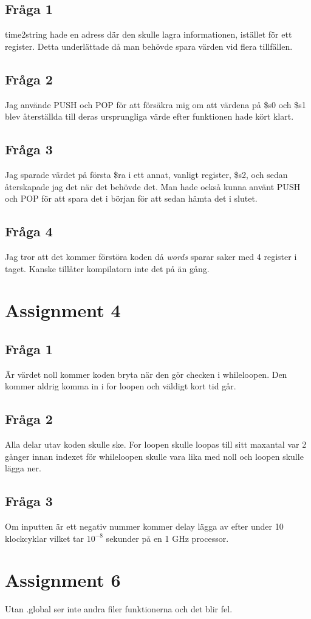 \documentclass[a4paper,11p]{article}
\begin{document}
\subsection{Fråga 1}
time2string hade en adress där den skulle lagra informationen, istället för ett register. Detta underlättade då man behövde spara värden vid flera tillfällen. 
\subsection{Fråga 2}
Jag använde PUSH och POP för att försäkra mig om att värdena på \$s0 och \$s1 blev återställda till deras ursprungliga värde efter funktionen hade kört klart.
\subsection{Fråga 3}
Jag sparade värdet på första \$ra i ett annat, vanligt register, \$s2, och sedan återskapade jag det när det behövde det. Man hade också kunna använt PUSH och POP för att spara det i början för att sedan hämta det i slutet.
\subsection{Fråga 4}
Jag tror att det kommer förstöra koden då \emph{words} sparar saker med 4 register i taget. Kanske tillåter kompilatorn inte det på än gång. 
\section{Assignment 4}
\subsection{Fråga 1}
Är värdet noll kommer koden bryta när den gör checken i whileloopen. Den kommer aldrig komma in i for loopen och väldigt kort tid går.
\subsection{Fråga 2}
Alla delar utav koden skulle ske. For loopen skulle loopas till sitt maxantal var 2 gånger innan indexet för whileloopen skulle vara lika med noll och loopen skulle lägga ner.
\subsection{Fråga 3}
Om inputten är ett negativ nummer kommer delay lägga av efter under 10 klockcyklar vilket tar $10^{-8}$ sekunder på en 1 GHz processor.
\section{Assignment 6}
Utan .global ser inte andra filer funktionerna och det blir fel.
\end{document}

